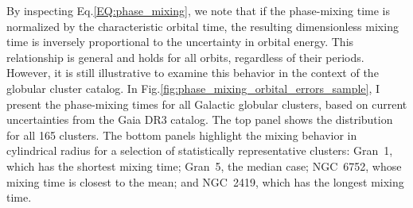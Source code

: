             By inspecting Eq.\ref{EQ:phase_mixing}, we note that if the phase-mixing time is normalized by the characteristic orbital time, the resulting dimensionless mixing time is inversely proportional to the uncertainty in orbital energy. This relationship is general and holds for all orbits, regardless of their periods. However, it is still illustrative to examine this behavior in the context of the globular cluster catalog. In Fig.\ref{fig:phase_mixing_orbital_errors_sample}, I present the phase-mixing times for all Galactic globular clusters, based on current uncertainties from the Gaia DR3 catalog. The top panel shows the distribution for all 165 clusters. The bottom panels highlight the mixing behavior in cylindrical radius for a selection of statistically representative clusters: Gran~1, which has the shortest mixing time; Gran~5, the median case; NGC~6752, whose mixing time is closest to the mean; and NGC~2419, which has the longest mixing time.

